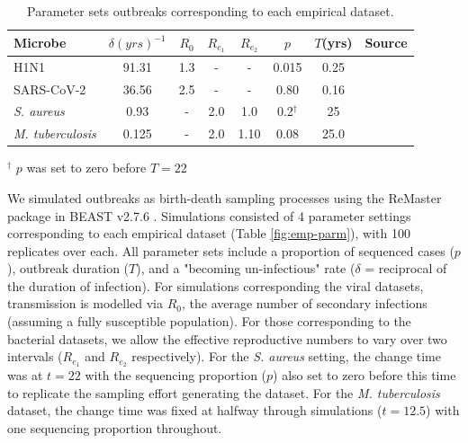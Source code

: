 \documentclass{article}
\begin{document}
\begin{spacing}{1.5}
\begin{table}[ht]
    \centering
    \caption{Parameter sets outbreaks corresponding to each empirical dataset.}
    \begin{tabular}{l|c|c|c|c|c|c|l|}
    \hline
    Microbe                     &   $\delta (yrs)^{-1}$    & $R_0$ &   $R_{e_1}$   &  $R_{e_2}$    &   $p$   &   $T$(yrs)   & Source \\
    \hline
    H1N1                        &   91.31    & 1.3 &   -   &  -    &   0.015   &   0.25 & \citet{hedge_2013_real-time} \\
    SARS-CoV-2                  &   36.56    & 2.5 &   -   &  -   &   0.80   &  0.16 & \citet{lane2021genomics} \\
    \textit{S. aureus}    &   0.93    &  - &   2.0   &  1.0   &   0.2$^{\dagger}$   &   25 & \citet{duchene_2016_genome} \\
    \textit{M. tuberculosis}    &   0.125    &  - &   2.0   &  1.10    &   0.08   &   25.0 & \citet{kuhnert_tuberculosis_2018} \\
    \hline
    \end{tabular}
    \label{tab:sim_parms}
\end{table}
\footnotesize{$^\dagger$ $p$ was set to zero before $T=22$}

We simulated outbreaks as birth-death sampling processes using the ReMaster package in BEAST v2.7.6 \citep{vaughan_remaster_2024,bouckaert_beast_2019}. Simulations consisted of 4 parameter settings corresponding to each empirical dataset (Table \ref{fig:emp-parm}), with 100 replicates over each. All parameter sets include a proportion of sequenced cases ($p$), outbreak duration ($T$), and a "becoming un-infectious" rate ($\delta$ = reciprocal of the duration of infection). For simulations corresponding the viral datasets, transmission is modelled via $R_0$, the average number of secondary infections (assuming a fully susceptible population). For those corresponding to the bacterial datasets, we allow the effective reproductive numbers to vary over two intervals ($R_{e_1}$ and $R_{e_2}$ respectively). For the \textit{S. aureus} setting, the change time was at $t=22$ with the sequencing proportion ($p$) also set to zero before this time to replicate the sampling effort generating the dataset. For the \textit{M. tuberculosis} dataset, the change time was fixed at halfway through simulations ($t=12.5$) with one sequencing proportion throughout.


\end{spacing}
\end{document}
